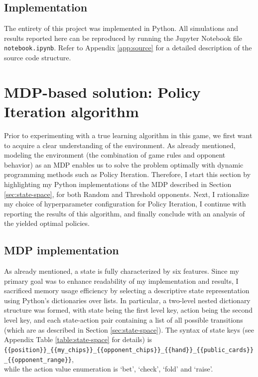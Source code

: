 \subsection{Implementation}

The entirety of this project was implemented in Python. All simulations and results reported here can be reproduced by running the Jupyter Notebook file \Verb|notebook.ipynb|. Refer to Appendix \ref{app:source} for a detailed description of the source code structure.

\section{MDP-based solution: Policy Iteration algorithm}

Prior to experimenting with a true learning algorithm in this game, we first want to acquire a clear understanding of the environment. As already mentioned, modeling the environment (the combination of game rules and opponent behavior) as an MDP enables us to solve the problem optimally with dynamic programming methods such as Policy Iteration. Therefore, I start this section by highlighting my Python implementations of the MDP described in Section \ref{sec:state-space}, for both Random and Threshold opponents. Next, I rationalize my choice of hyperparameter configuration for Policy Iteration, I continue with reporting the results of this algorithm, and finally conclude with an analysis of the yielded optimal policies.

\subsection{MDP implementation}

As already mentioned, a state is fully characterized by six features. Since my primary goal was to enhance readability of my implementation and results, I sacrificed memory usage efficiency by selecting a descriptive state representation using Python's dictionaries over lists. In particular, a two-level nested dictionary structure was formed, with state being the first level key, action being the second level key, and each state-action pair containing a list of all possible transitions (which are as described in Section \ref{sec:state-space}). The syntax of state keys (see Appendix Table \ref{table:state-space} for details) is {\small \Verb|{{position}}_{{my_chips}}_{{opponent_chips}}_{{hand}}_{{public_cards}}_{{opponent_range}}|}, \\ while the action value enumeration is `bet', `check', `fold' and `raise'.

